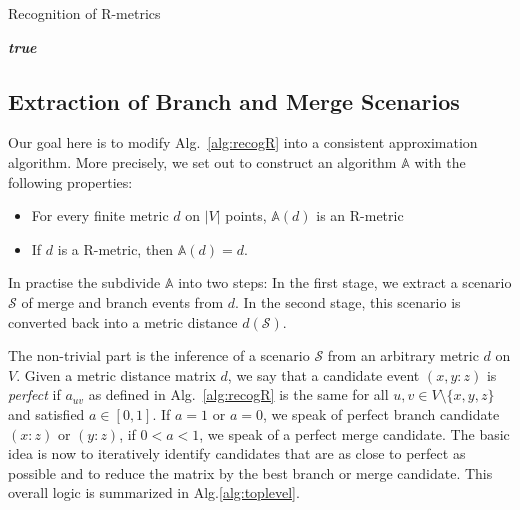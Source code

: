 \documentclass{article}
\newcommand{\TODO}[1]{\begingroup\color{red}#1\endgroup}
\begin{document}
\begin{algorithm}[H]
\caption{Recognition of R-metrics}
\label{alg:recogR}
\SetAlgoLined

\Return \emph{\textbf{true}}
\end{algorithm}

\subsection{Extraction of Branch and Merge Scenarios} 

Our goal here is to modify Alg.~\ref{alg:recogR} into a consistent
approximation algorithm. More precisely, we set out to construct an
algorithm $\mathbb{A}$ with the following properties:
\begin{itemize} 
  \item For every finite metric $d$ on $|V|$ points, $\mathbb{A}(d)$ 
    is an R-metric
  \item If $d$ is a R-metric, then $\mathbb{A}(d)=d$.
\end{itemize} 
In practise the subdivide $\mathbb{A}$ into two steps: In the first stage,
we extract a scenario $\mathcal{S}$ of merge and branch events from $d$. In
the second stage, this scenario is converted back into a metric distance
$d(\mathcal{S})$.

The non-trivial part is the inference of a scenario $\mathcal{S}$ from an
arbitrary metric $d$ on $V$. Given a metric distance matrix $d$, we say
that a candidate event $(x,y:z)$ is \emph{perfect} if $a_{uv}$ as defined
in Alg.~\ref{alg:recogR} is the same for all $u,v\in V\setminus\{x,y,z\}$
and satisfied $a\in [0,1]$. If $a=1$ or $a=0$, we speak of perfect branch
candidate $(x:z)$ or $(y:z)$, if $0<a<1$, we speak of a perfect merge
candidate. The basic idea is now to iteratively identify candidates that
are as close to perfect as possible and to reduce the matrix by the best
branch or merge candidate. This overall logic is summarized in
Alg.\ref{alg:toplevel}.
\end{document}
